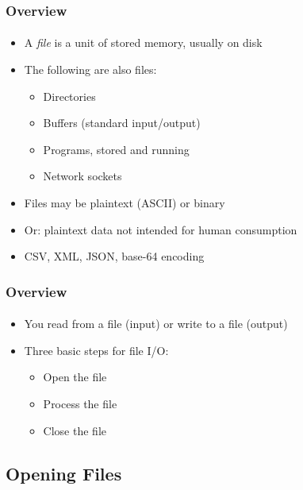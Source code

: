 \documentclass[]{beamer}
\begin{document}
\begin{frame}[fragile]
  \frametitle{Overview}
  \framesubtitle{}

\begin{itemize}[<+->]
  \item A \emph{file} is a unit of stored memory, usually on disk
  \item The following are also files:
  \begin{itemize}
    \item Directories
    \item Buffers (standard input/output)
    \item Programs, stored and running
    \item Network sockets
  \end{itemize}
  \item Files may be plaintext (ASCII) or binary
  \item Or: plaintext data not intended for human consumption
  \item CSV, XML, JSON, base-64 encoding
\end{itemize}

\end{frame}

\begin{frame}[fragile]
  \frametitle{Overview}
  \framesubtitle{}

\begin{itemize}[<+->]

  \item You read from a file (input) or write to a file (output)
  \item Three basic steps for file I/O:
  \begin{itemize}
    \item Open the file
    \item Process the file
    \item Close the file
  \end{itemize}
\end{itemize}

\end{frame}

\subsection{Opening Files}
\end{document}
